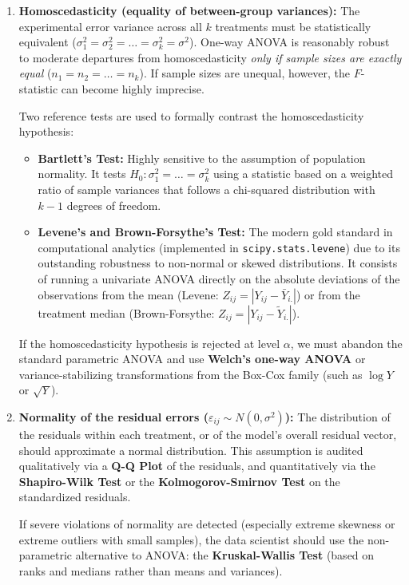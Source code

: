 \begin{enumerate}
	\item \textbf{Homoscedasticity (equality of between-group variances):} The experimental error variance across all $k$ treatments must be statistically equivalent ($\sigma_1^2 = \sigma_2^2 = \ldots = \sigma_k^2 = \sigma^2$). One-way ANOVA is reasonably robust to moderate departures from homoscedasticity \emph{only if sample sizes are exactly equal} ($n_1 = n_2 = \ldots = n_k$). If sample sizes are unequal, however, the $F$-statistic can become highly imprecise.

	Two reference tests are used to formally contrast the homoscedasticity hypothesis:
	\begin{itemize}
		\item \textbf{Bartlett's Test:} Highly sensitive to the assumption of population normality. It tests $H_0: \sigma_1^2 = \ldots = \sigma_k^2$ using a statistic based on a weighted ratio of sample variances that follows a chi-squared distribution with $k-1$ degrees of freedom.
		\item \textbf{Levene's and Brown-Forsythe's Test:} The modern gold standard in computational analytics (implemented in \texttt{scipy.stats.levene}) due to its outstanding robustness to non-normal or skewed distributions. It consists of running a univariate ANOVA directly on the absolute deviations of the observations from the mean (Levene: $Z_{ij} = |Y_{ij} - \bar{Y}_{i.}|$) or from the treatment median (Brown-Forsythe: $Z_{ij} = |Y_{ij} - \tilde{Y}_{i.}|$).
	\end{itemize}
	If the homoscedasticity hypothesis is rejected at level $\alpha$, we must abandon the standard parametric ANOVA and use \textbf{Welch's one-way ANOVA} or variance-stabilizing transformations from the Box-Cox family (such as $\log Y$ or $\sqrt{Y}$).

	\item \textbf{Normality of the residual errors ($\varepsilon_{ij} \sim N(0,\sigma^2)$):} The distribution of the residuals within each treatment, or of the model's overall residual vector, should approximate a normal distribution. This assumption is audited qualitatively via a \textbf{Q-Q Plot} of the residuals, and quantitatively via the \textbf{Shapiro-Wilk Test} or the \textbf{Kolmogorov-Smirnov Test} on the standardized residuals.

	If severe violations of normality are detected (especially extreme skewness or extreme outliers with small samples), the data scientist should use the non-parametric alternative to ANOVA: the \textbf{Kruskal-Wallis Test} (based on ranks and medians rather than means and variances).


\end{enumerate}
